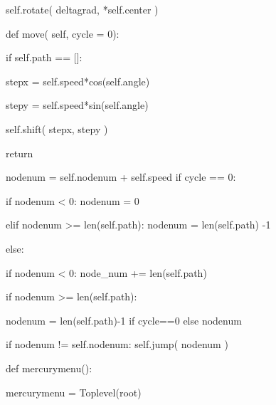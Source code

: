 \documentclass[14pt, oneside]{SavkinSeliverstov}
\begin{document}
		self.rotate( delta\underline{\hspace{0.2cm}}grad, *self.center )
		

	def move( self, cycle = 0):
		
		if self.path == []:
		
			step\underline{\hspace{0.2cm}}x = self.speed*cos(self.angle)
			
			step\underline{\hspace{0.2cm}}y = self.speed*sin(self.angle)
			
			self.shift( step\underline{\hspace{0.2cm}}x, step\underline{\hspace{0.2cm}}y )
			
			return
		
		node\underline{\hspace{0.2cm}}num = self.node\underline{\hspace{0.2cm}}num + self.speed
		if cycle == 0:
		
			if node\underline{\hspace{0.2cm}}num < 0: node\underline{\hspace{0.2cm}}num = 0
			
			elif node\underline{\hspace{0.2cm}}num >= len(self.path): node\underline{\hspace{0.2cm}}num = len(self.path) -1
			
		else:
		
			if node\underline{\hspace{0.2cm}}num < 0: node_num += len(self.path)
			
			if node\underline{\hspace{0.2cm}}num >= len(self.path):
			
				node\underline{\hspace{0.2cm}}num = len(self.path)-1 if cycle==0 else
				node\underline{\hspace{0.2cm}}num %
				
		
		if node\underline{\hspace{0.2cm}}num != self.node\underline{\hspace{0.2cm}}num:
			self.jump( node\underline{\hspace{0.2cm}}num )
			

def mercury\underline{\hspace{0.2cm}}menu():

	mercury\underline{\hspace{0.2cm}}menu = Toplevel(root)
	
\end{document}
